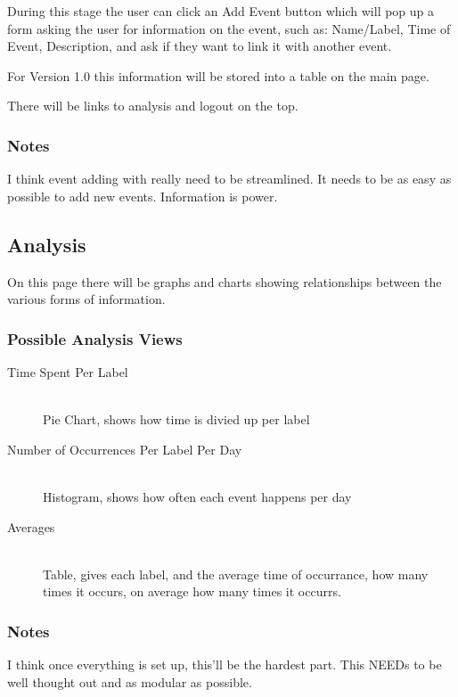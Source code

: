 \documentclass[12pt]{article}
\begin{document}
During this stage the user can click an Add Event button which will pop up a form asking the user for information on the event, such as: Name/Label, Time of Event, Description, and ask if they want to link it with another event.

For Version 1.0 this information will be stored into a table on the main page.

There will be links to analysis and logout on the top.

\subsubsection{Notes}

I think event adding with really need to be streamlined. It needs to be as easy as possible to add new events. Information is power.

\subsection{Analysis}

On this page there will be graphs and charts showing relationships between the various forms of information. 

\subsubsection{Possible Analysis Views}

\begin{description}
  \item[Time Spent Per Label] \hfill \\
    Pie Chart, shows how time is divied up per label
  \item[Number of Occurrences Per Label Per Day] \hfill \\
    Histogram, shows how often each event happens per day
  \item[Averages] \hfill \\
    Table, gives each label, and the average time of occurrance, how many times it occurs, on average how many times it occurrs. 
\end{description}

\subsubsection{Notes}

I think once everything is set up, this'll be the hardest part. This NEEDs to be well thought out and as modular as possible.
\end{document}
